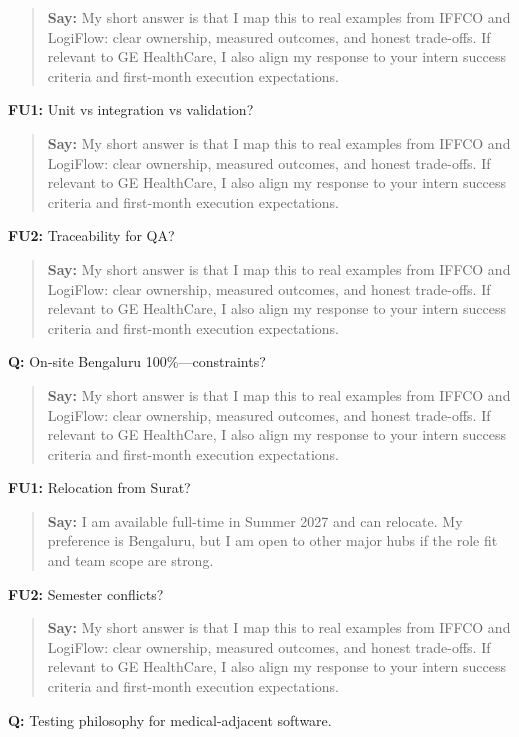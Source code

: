 \documentclass[9pt,a4paper]{article}
\begin{document}
\begin{quote}\small\textbf{Say:} My short answer is that I map this to real examples from IFFCO and LogiFlow: clear ownership, measured outcomes, and honest trade-offs. If relevant to GE HealthCare, I also align my response to your intern success criteria and first-month execution expectations.\end{quote}
\vspace{2mm}
\textbf{FU1:} Unit vs integration vs validation?

\begin{quote}\small\textbf{Say:} My short answer is that I map this to real examples from IFFCO and LogiFlow: clear ownership, measured outcomes, and honest trade-offs. If relevant to GE HealthCare, I also align my response to your intern success criteria and first-month execution expectations.\end{quote}
\vspace{2mm}
\textbf{FU2:} Traceability for QA?

\begin{quote}\small\textbf{Say:} My short answer is that I map this to real examples from IFFCO and LogiFlow: clear ownership, measured outcomes, and honest trade-offs. If relevant to GE HealthCare, I also align my response to your intern success criteria and first-month execution expectations.\end{quote}
\vspace{2mm}
\textbf{Q:} On-site Bengaluru 100\%---constraints?

\begin{quote}\small\textbf{Say:} My short answer is that I map this to real examples from IFFCO and LogiFlow: clear ownership, measured outcomes, and honest trade-offs. If relevant to GE HealthCare, I also align my response to your intern success criteria and first-month execution expectations.\end{quote}
\vspace{2mm}
\textbf{FU1:} Relocation from Surat?

\begin{quote}\small\textbf{Say:} I am available full-time in Summer 2027 and can relocate. My preference is Bengaluru, but I am open to other major hubs if the role fit and team scope are strong.\end{quote}
\vspace{2mm}
\textbf{FU2:} Semester conflicts?

\begin{quote}\small\textbf{Say:} My short answer is that I map this to real examples from IFFCO and LogiFlow: clear ownership, measured outcomes, and honest trade-offs. If relevant to GE HealthCare, I also align my response to your intern success criteria and first-month execution expectations.\end{quote}
\vspace{2mm}
\textbf{Q:} Testing philosophy for medical-adjacent software.
\end{document}
